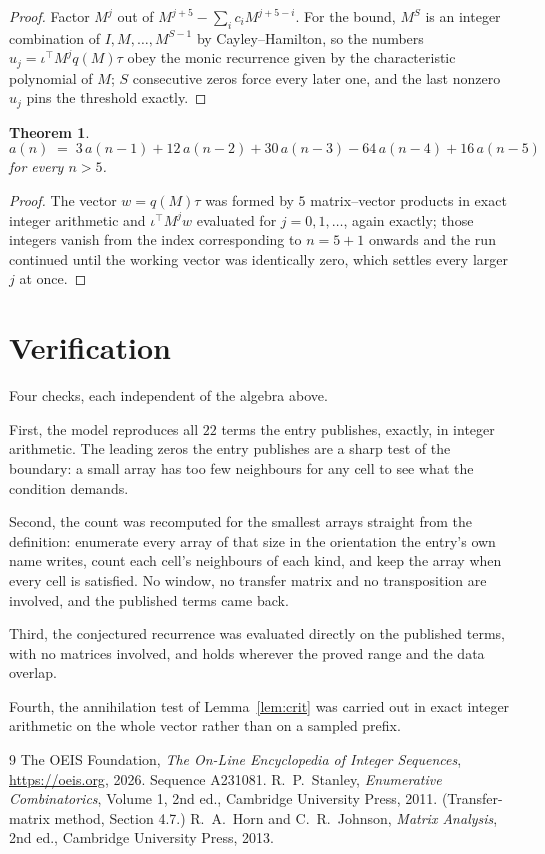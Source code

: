 \documentclass[11pt,a4paper]{article}
\theoremstyle{plain}
\newtheorem{theorem}{Theorem}
\theoremstyle{definition}
\begin{document}
\begin{proof}
Factor $M^{j}$ out of $M^{j+5}-\sum_ic_iM^{j+5-i}$. For the bound, $M^{S}$
is an integer combination of $I,M,\dots,M^{S-1}$ by Cayley--Hamilton, so the numbers
$u_j=\iota^{\!\top}M^{j}q(M)\tau$ obey the monic recurrence given by the characteristic
polynomial of $M$; $S$ consecutive zeros force every later one, and the last nonzero $u_j$
pins the threshold exactly.
\end{proof}

\begin{theorem}
\[
a(n)\;=\;3\,a(n-1) + 12\,a(n-2) + 30\,a(n-3) - 64\,a(n-4) + 16\,a(n-5)
\]
for every $n>5$.
\end{theorem}

\begin{proof}
The vector $w=q(M)\tau$ was formed by $5$ matrix--vector products in exact integer
arithmetic and $\iota^{\!\top}M^{j}w$ evaluated for $j=0,1,\dots$, again exactly; those
integers vanish from the index corresponding to $n=5+1$ onwards and the run continued
until the working vector was identically zero, which settles every larger $j$ at once.
\end{proof}

\section{Verification}

Four checks, each independent of the algebra above.

First, the model reproduces all $22$ terms the entry publishes, exactly, in integer
arithmetic. The leading zeros the entry publishes are a sharp test of the boundary: a small
array has too few neighbours for any cell to see what the condition demands.

Second, the count was recomputed for the smallest arrays straight from the definition:
enumerate every array of that size in the orientation the entry's own name writes, count each
cell's neighbours of each kind, and keep the array when every cell is satisfied. No window, no
transfer matrix and no transposition are involved, and the published terms came back.

Third, the conjectured recurrence was evaluated directly on the published terms, with no
matrices involved, and holds wherever the proved range and the data overlap.

Fourth, the annihilation test of Lemma~\ref{lem:crit} was carried out in exact integer
arithmetic on the whole vector rather than on a sampled prefix.

\begin{thebibliography}{9}
 The OEIS Foundation, \emph{The On-Line Encyclopedia of Integer
Sequences}, \url{https://oeis.org}, 2026. Sequence A231081.
 R.~P.~Stanley, \emph{Enumerative Combinatorics}, Volume 1, 2nd ed.,
Cambridge University Press, 2011. (Transfer-matrix method, Section 4.7.)
 R.~A.~Horn and C.~R.~Johnson, \emph{Matrix Analysis}, 2nd ed., Cambridge
University Press, 2013.
\end{thebibliography}
\end{document}
